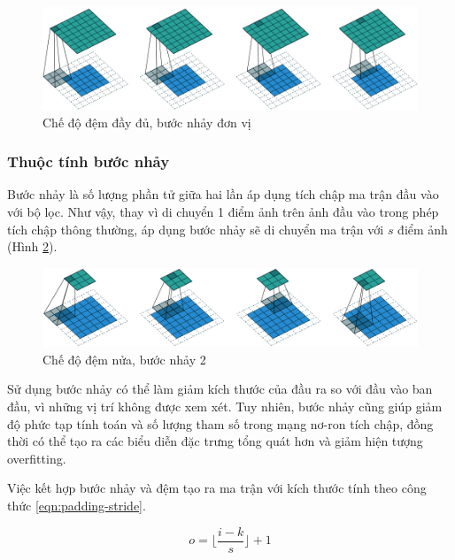 \begin{figure}
	\centering
	\includegraphics[width=0.9\linewidth]{images/full-padding-unit-stride}
	\caption{Chế độ đệm đầy đủ, bước nhảy đơn vị}
	\label{fig:full-padding-unit-stride}
\end{figure}

\subsubsection{Thuộc tính bước nhảy}

Bước nhảy là số lượng phần tử giữa hai lần áp dụng tích chập ma trận đầu vào với bộ lọc. Như vậy, thay vì di chuyển 1 điểm ảnh trên ảnh đầu vào trong phép tích chập thông thường, áp dụng bước nhảy sẽ di chuyển ma trận với $s$ điểm ảnh (Hình \ref{fig:half-padding-stride-2}).

\begin{figure}[h]
	\centering
	\includegraphics[width=0.9\linewidth]{images/half-padding-stride-2}
	\caption{Chế độ đệm nửa, bước nhảy 2}
	\label{fig:half-padding-stride-2}
\end{figure}

Sử dụng bước nhảy có thể làm giảm kích thước của đầu ra so với đầu vào ban đầu, vì những vị trí không được xem xét. Tuy nhiên, bước nhảy cũng giúp giảm độ phức tạp tính toán và số lượng tham số trong mạng nơ-ron tích chập, đồng thời có thể tạo ra các biểu diễn đặc trưng tổng quát hơn và giảm hiện tượng overfitting.


Việc kết hợp bước nhảy và đệm tạo ra ma trận với kích thước tính theo công thức \ref{eqn:padding-stride}.

\begin{equation}\label{eqn:padding-stride}
	o = \lfloor{\frac{i-k}{s}}\rfloor + 1
\end{equation}

